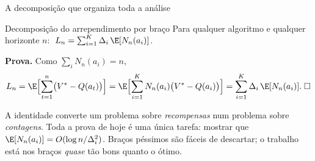 \documentclass[aspectratio=169, 11pt]{beamer}
\begin{document}
\begin{frame}{A decomposição que organiza toda a análise}
  \begin{teobox}{Decomposição do arrependimento por braço}
    Para qualquer algoritmo e qualquer horizonte $n$:
    $\;L_n = \sum_{i=1}^{K}\Delta_i\,\E[N_n(a_i)]$.
  \end{teobox}

  {\small\textbf{Prova.} Como $\sum_i N_n(a_i)=n$,
  \[
    L_n = \E\Bigl[\sum_{t=1}^{n}\bigl(V^{*}-Q(a_t)\bigr)\Bigr]
        = \E\Bigl[\sum_{i=1}^{K} N_n(a_i)\bigl(V^{*}-Q(a_i)\bigr)\Bigr]
        = \sum_{i=1}^{K}\Delta_i\,\E[N_n(a_i)]. \;\square
  \]}

  \begin{ideiabox}
    A identidade converte um problema sobre \emph{recompensas} num problema
    sobre \emph{contagens}. Toda a prova de hoje é uma única tarefa: mostrar
    que $\E[N_n(a_i)] = O(\log n/\Delta_i^2)$. Braços péssimos são fáceis de
    descartar; o trabalho está nos braços \emph{quase} tão bons quanto o ótimo.
  \end{ideiabox}
\end{frame}
\end{document}
